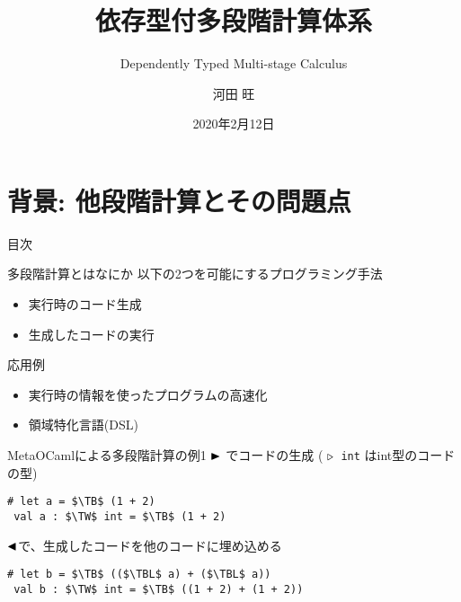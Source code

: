\documentclass[dvipdfmx,aspectratio=169, 20pt]{beamer}
\title{依存型付多段階計算体系}
\subtitle{Dependently Typed Multi-stage Calculus}
\author{河田 旺}
\institute{五十嵐・末永研究室}
\date{2020年2月12日}
\begin{document}
\maketitle



\section{背景: 他段階計算とその問題点}

%
%

\begin{frame}{目次}
    \tableofcontents[currentsection]
\end{frame}

\begin{frame}[fragile]{多段階計算とはなにか}
    以下の2つを可能にするプログラミング手法
    \begin{itemize}
        \item 実行時のコード生成
        \item 生成したコードの実行
    \end{itemize}
    応用例
    \begin{itemize}
        \item 実行時の情報を使ったプログラムの高速化
        \item 領域特化言語(DSL)
    \end{itemize}
\end{frame}

\begin{frame}[fragile]{MetaOCamlによる多段階計算の例1}
    \( {\mathop{\blacktriangleright}} \) でコードの生成 ( \( {\mathop{\triangleright}} \)\ \verb|int| はint型のコードの型)
    \begin{exampleblock}{}
        \begin{Verbatim}[commandchars=\\\{\},codes={\catcode`$=3\catcode`^=7}]
 # let a = $\TB$ (1 + 2)
 val a : $\TW$ int = $\TB$ (1 + 2)
        \end{Verbatim}
    \end{exampleblock}
    \( {\mathop{\blacktriangleleft}} \)で、生成したコードを他のコードに埋め込める
    \begin{exampleblock}{}
        \begin{Verbatim}[commandchars=\\\{\},codes={\catcode`$=3\catcode`^=7}]
 # let b = $\TB$ (($\TBL$ a) + ($\TBL$ a))
 val b : $\TW$ int = $\TB$ ((1 + 2) + (1 + 2))
        \end{Verbatim}
    \end{exampleblock}
\end{frame}
\end{document}
